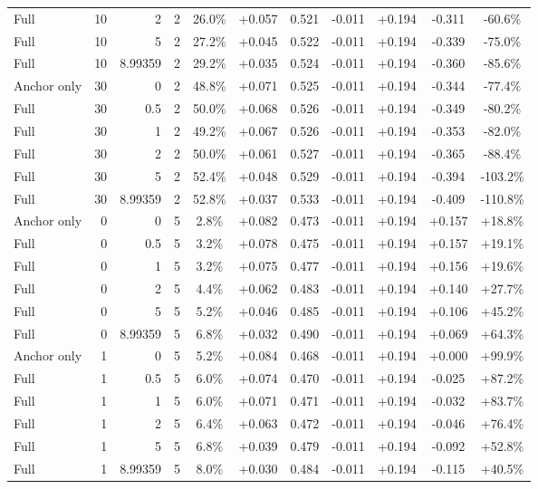 \begin{table}[htbp]
\begin{tabular}{lrrrccccccc}
Full & 10 & 2 & 2 & 26.0\% & +0.057 & 0.521 & -0.011 & +0.194 & -0.311 & -60.6\% \\
Full & 10 & 5 & 2 & 27.2\% & +0.045 & 0.522 & -0.011 & +0.194 & -0.339 & -75.0\% \\
Full & 10 & 8.99359 & 2 & 29.2\% & +0.035 & 0.524 & -0.011 & +0.194 & -0.360 & -85.6\% \\
Anchor only & 30 & 0 & 2 & 48.8\% & +0.071 & 0.525 & -0.011 & +0.194 & -0.344 & -77.4\% \\
Full & 30 & 0.5 & 2 & 50.0\% & +0.068 & 0.526 & -0.011 & +0.194 & -0.349 & -80.2\% \\
Full & 30 & 1 & 2 & 49.2\% & +0.067 & 0.526 & -0.011 & +0.194 & -0.353 & -82.0\% \\
Full & 30 & 2 & 2 & 50.0\% & +0.061 & 0.527 & -0.011 & +0.194 & -0.365 & -88.4\% \\
Full & 30 & 5 & 2 & 52.4\% & +0.048 & 0.529 & -0.011 & +0.194 & -0.394 & -103.2\% \\
Full & 30 & 8.99359 & 2 & 52.8\% & +0.037 & 0.533 & -0.011 & +0.194 & -0.409 & -110.8\% \\
Anchor only & 0 & 0 & 5 & 2.8\% & +0.082 & 0.473 & -0.011 & +0.194 & +0.157 & +18.8\% \\
Full & 0 & 0.5 & 5 & 3.2\% & +0.078 & 0.475 & -0.011 & +0.194 & +0.157 & +19.1\% \\
Full & 0 & 1 & 5 & 3.2\% & +0.075 & 0.477 & -0.011 & +0.194 & +0.156 & +19.6\% \\
Full & 0 & 2 & 5 & 4.4\% & +0.062 & 0.483 & -0.011 & +0.194 & +0.140 & +27.7\% \\
Full & 0 & 5 & 5 & 5.2\% & +0.046 & 0.485 & -0.011 & +0.194 & +0.106 & +45.2\% \\
Full & 0 & 8.99359 & 5 & 6.8\% & +0.032 & 0.490 & -0.011 & +0.194 & +0.069 & +64.3\% \\
Anchor only & 1 & 0 & 5 & 5.2\% & +0.084 & 0.468 & -0.011 & +0.194 & +0.000 & +99.9\% \\
Full & 1 & 0.5 & 5 & 6.0\% & +0.074 & 0.470 & -0.011 & +0.194 & -0.025 & +87.2\% \\
Full & 1 & 1 & 5 & 6.0\% & +0.071 & 0.471 & -0.011 & +0.194 & -0.032 & +83.7\% \\
Full & 1 & 2 & 5 & 6.4\% & +0.063 & 0.472 & -0.011 & +0.194 & -0.046 & +76.4\% \\
Full & 1 & 5 & 5 & 6.8\% & +0.039 & 0.479 & -0.011 & +0.194 & -0.092 & +52.8\% \\
Full & 1 & 8.99359 & 5 & 8.0\% & +0.030 & 0.484 & -0.011 & +0.194 & -0.115 & +40.5\% \\

\end{tabular}
\end{table}
